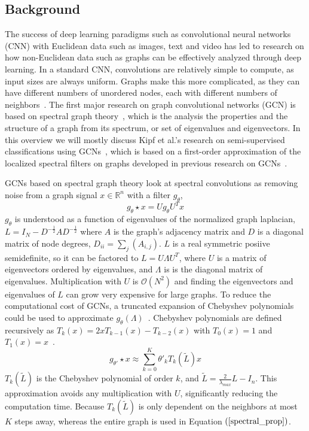 \subsection{Background}
The success of deep learning paradigms such as convolutional neural networks (CNN) with Euclidean data such as images, text and video has led to research on how non-Euclidean data such as graphs can be effectively analyzed through deep learning. In a standard CNN, convolutions are relatively simple to compute, as input sizes are always uniform. Graphs make this more complicated, as they can have different numbers of unordered nodes, each with different numbers of neighbors~\cite{Wu2019}. The first major research on graph convolutional networks (GCN) is based on spectral graph theory~\cite{Bruna2013}, which is the analysis the properties and the structure of a graph from its spectrum, or set of eigenvalues and eigenvectors. In this overview we will mostly discuss Kipf et al.'s research on semi-supervised classifications using GCNs~\cite{Kipf2016}, which is based on a first-order approximation of the localized spectral filters on graphs developed in previous research on GCNs~\cite{Bruna2013}. 

GCNs based on spectral graph theory look at spectral convolutions as removing noise from a graph signal $x \in \mathbb{R}^n$ with a filter $g_\theta$,
\setcounter{equation}{0}
\begin{equation}
\label{spectral_prop}
g_\theta \star x = Ug_\theta U^Tx
\end{equation}
$g_\theta$ is understood as a function of eigenvalues of the normalized graph laplacian, $L = I_N - D^{-\frac{1}{2}}AD^{-\frac{1}{2}}$ where $A$ is the graph's adjacency matrix and $D$ is a diagonal matrix of node degrees, $D_{ii} = \sum_{j} (A_{i,j})$. $L$ is a real symmetric posiive semidefinite, so it can be factored to $L = U\Lambda U^T$, where $U$ is a matrix of eigenvectors ordered by eigenvalues, and $\Lambda$ is is the diagonal matrix of eigenvalues. Multiplication with $U$ is $\mathcal{O}(N^2) $ and finding the eigenvectors and eigenvalues of $L$ can grow very expensive for large graphs. To reduce the computational cost of GCNs, a truncated expansion of Chebyshev polynomials could be used to approximate $g_\theta (\Lambda)$~\cite{Defferrard2016}.
Chebyshev polynomials are defined recursively as $T_k(x) = 2xT_{k-1}(x) - T_{k-2}(x)$ with $T_0(x) = 1$ and $T_1(x) = x$~\cite{Hammond2011}.
\begin{equation}
\label{cheby_prop}
g_{\theta'} \star x \approx \sum\limits_{k=0}^{K} \theta'_k T_k (\tilde{L})x
\end{equation}
$T_k(\tilde{L})$ is the Chebyshev polynomial of order $k$, and $\tilde{L} = \frac{2}{\lambda_{max}} L - I_n$. This approximation avoids any multiplication with $U$, significantly reducing the computation time. Because $T_k(\tilde{L})$ is only dependent on the neighbors at most $K$ steps away, whereas the entire graph is used in Equation $(\ref{spectral_prop})$.


